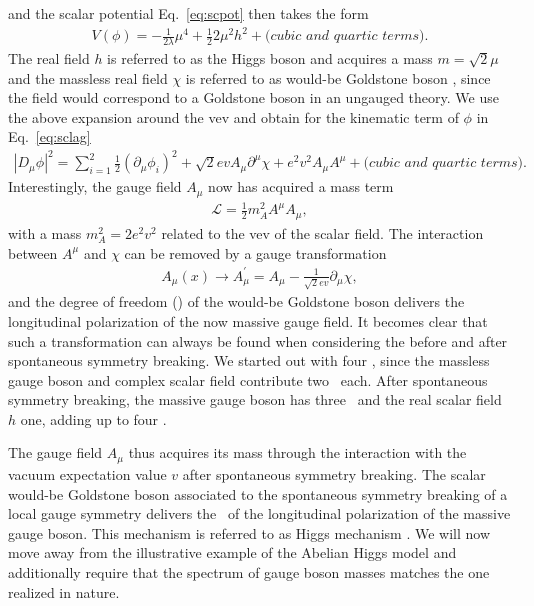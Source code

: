 and the scalar potential Eq.~\eqref{eq:scpot} then takes the form
\begin{align}
  V(\phi) =  -\frac{1}{2\lambda}\mu^4+\frac{1}{2}2\mu^2h^2+\textit{(cubic
  and quartic terms)}.
\end{align}
The real field $h$ is referred to as the Higgs boson and acquires a
mass $m=\sqrt{2}\mu$ and the massless real field
$\chi$ is referred to as would-be Goldstone boson
\cite{Goldstone1961,Goldstone1962}, since the field would correspond to a Goldstone boson in an ungauged theory. We use the above
expansion around the vev and obtain for the kinematic term of $\phi$ in Eq.~\eqref{eq:sclag}
\begin{align}
  |D_\mu \phi|^2 = \sum_{i=1}^2\frac{1}{2}\left(\partial_\mu\phi_i\right)^2+\sqrt{2}ev
  A_\mu\partial^\mu\chi+e^2v^2 A_\mu A^\mu+\textit{(cubic
  and quartic terms)}.
\end{align}
Interestingly, the
gauge field $A_\mu$ now has acquired a mass term
\begin{align}
  \mathcal{L} = \frac{1}{2}m_A^2 A^\mu A_\mu,
\end{align}
with a mass $m_A^2=2e^2v^2$ related to the vev of the scalar
field. The interaction between $A^\mu$ and $\chi$ can be removed by a gauge transformation
\begin{align}
  A_\mu(x) \rightarrow A_{\mu}^{\prime} = A_\mu-\frac{1}{\sqrt{2}ev}\partial_\mu \chi,
\end{align}
and the degree of freedom (\dof) of the would-be Goldstone boson delivers the
longitudinal polarization of the now massive gauge field. It becomes clear that such a transformation can always be
found when considering the \dof{} before and after
spontaneous symmetry breaking. We started out with four \dof{}, since the massless gauge boson and complex
scalar field contribute two \dof{}~each. After spontaneous symmetry
breaking, the massive gauge boson has three \dof~and the real scalar
field $h$ one, adding up to four \dof. 

The gauge field $A_\mu$
thus acquires its mass through the
interaction with the vacuum expectation value $v$ after
spontaneous symmetry breaking. The scalar would-be Goldstone boson associated to the
spontaneous symmetry breaking of a local gauge symmetry delivers the
\dof~of the longitudinal polarization of the massive gauge boson. This mechanism is referred to as Higgs
mechanism \cite{Higgs1964b,Higgs1964,Englert1964,Higgs1966}. We will now move away from the illustrative example of the
Abelian Higgs model and additionally require that the spectrum of gauge boson masses
matches the one realized in nature.

